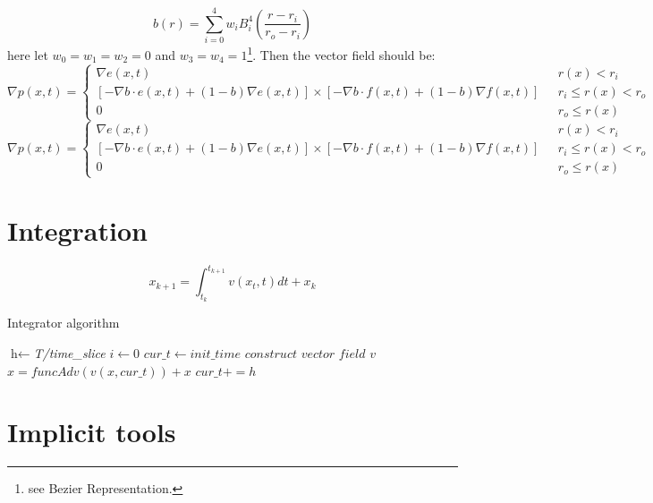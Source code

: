 \documentclass{article}
\theoremstyle{definition}
\theoremstyle{remark}
\begin{document}
\begin{equation}
  b(r) = \sum\limits_{i=0}^4 w_i B_i^4(\frac{r-r_i}{r_o-r_i})
\end{equation}
here let $w_0 = w_1 = w_2 = 0$ and $w_3 = w_4 = 1$\footnote{\noindent see Bezier Representation.}.
Then the vector field should be:
\begin{equation}
 \nabla p(x,t) = \begin{cases} \nabla e(x,t) & \mbox{ } r(x) <r_i\\
   [-\nabla b \cdot e(x,t) + (1-b) \nabla e(x,t)] \times [-\nabla b \cdot f(x,t) + (1-b) \nabla f(x,t)] & \mbox{ } r_i \le r(x) < r_o\\
   0 & \mbox{ } r_o \le r(x) \end{cases}
\end{equation}
\begin{equation}
 \nabla p(x,t) = \begin{cases} \nabla e(x,t) & \mbox{ } r(x) <r_i\\
   [-\nabla b \cdot e(x,t) + (1-b) \nabla e(x,t)] \times [-\nabla b \cdot f(x,t) + (1-b) \nabla f(x,t)] & \mbox{ } r_i \le r(x) < r_o\\
   0 & \mbox{ } r_o \le r(x) \end{cases}
\end{equation}

\section{Integration}
\begin{equation}
  x_{k+1} = \int_{t_k}^{t_{k+1}} v(x_t, t) dt + x_k
\end{equation}

\begin{algorithm}
\caption{Integrator algorithm}\label{euclid}
\begin{algorithmic}
\State $\textit{h} \gets $\textit{T/time\_slice}
\State $i \gets \textit{0}$
\State $cur\_t \gets \textit{init\_time}$
\EndProcedure
 \State $\textit{construct vector field v}$
 \State$x = funcAdv(v(x,cur\_t)) + x$
 \State$cur\_t += h$
\EndFor
\end{algorithmic}
\end{algorithm}

\section{Implicit tools}
\end{document}
